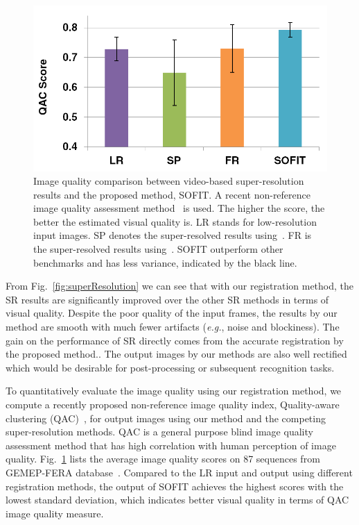 \documentclass[10pt,journal]{IEEEtran}
\begin{document}
\begin{figure}[t]
	\centering
		\includegraphics[width=.8\columnwidth]{fig/SR_quant.png}
	\caption{Image quality comparison between video-based super-resolution results and the proposed method, SOFIT. A recent non-reference image quality assessment method~\cite{Xue_CVPR13} is used. The higher the score, the better the estimated visual quality is. LR stands for low-resolution input images. SP denotes the super-resolved results using~\cite{Keren_CVPR88}. FR is the super-resolved results using~\cite{Vandewalle06}. SOFIT outperform other benchmarks and has less variance, indicated by the black line. }
	\label{fig:SR_quant}
\end{figure}


From Fig.~\ref{fig:superResolution} we can see that with our registration method, the SR results are significantly improved over the other SR methods in terms of visual quality. Despite the poor quality of the input frames, the results by our method are smooth with much fewer artifacts (\textit{e.g.}, noise and blockiness). The gain on the performance of SR directly comes from the accurate registration by the proposed method.. The output images by our methods are also well rectified which would be desirable for post-processing or subsequent recognition tasks. 




To quantitatively evaluate the image quality using our registration method, we compute a recently proposed non-reference image quality index, Quality-aware clustering (QAC)~\cite{Xue_CVPR13}, for output images using our method and the competing super-resolution methods. QAC is a general purpose blind image quality assessment method that has high correlation with human perception of image quality. Fig.~\ref{fig:SR_quant} lists the average image quality scores on 87 sequences from GEMEP-FERA database~\cite{FERA11}. Compared to the LR input and output using different registration methods, the output of SOFIT achieves the highest scores with the lowest standard deviation, which indicates better visual quality in terms of QAC image quality measure.
\end{document}

